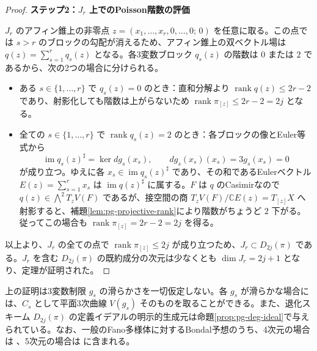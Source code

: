 \begin{proof}
\par\medskip\noindent\textbf{ステップ2：$J_r$ 上でのPoisson階数の評価}\par\nobreak\smallskip
$J_r$ のアフィン錐上の非零点 $z=(x_1,\ldots,x_r,0,\ldots,0;\,0)$ を任意に取る。この点では $s>r$ のブロックの勾配が消えるため、アフィン錐上の双ベクトル場は $q(z)=\sum_{s=1}^r q_s(z)$ となる。各3変数ブロック $q_s(z)$ の階数は $0$ または $2$ であるから、次の2つの場合に分けられる。
\begin{itemize}
  \item ある $s\in\{1,\ldots,r\}$ で $q_s(z)=0$ のとき：直和分解より $\operatorname{rank} q(z)\le 2r-2$ であり、射影化しても階数は上がらないため $\operatorname{rank}\pi_{[z]}\le 2r-2=2j$ となる。
  \item 全ての $s\in\{1,\ldots,r\}$ で $\operatorname{rank} q_s(z)=2$ のとき：各ブロックの像とEuler等式から
  \begin{equation}
    \operatorname{im}q_s(z)^\sharp=\ker dg_s(x_s),
    \qquad dg_s(x_s)(x_s)=3g_s(x_s)=0
  \end{equation}
  が成り立つ。ゆえに各 $x_s\in\operatorname{im}q_s(z)^\sharp$ であり、その和であるEulerベクトル $E(z)=\sum_{s=1}^r x_s$ は $\operatorname{im}q(z)^\sharp$ に属する。$F$ は $q$ のCasimirなので $q(z)\in\bigwedge^2 T_z V(F)$ であるが、接空間の商 $T_z V(F)/\mathbb C E(z)=T_{[z]}X$ へ射影すると、補題\ref{lem:pg-projective-rank}により階数がちょうど $2$ 下がる。従ってこの場合も $\operatorname{rank}\pi_{[z]}=2r-2=2j$ を得る。
\end{itemize}
以上より、$J_r$ の全ての点で $\operatorname{rank}\pi_{[z]}\le 2j$ が成り立つため、$J_r\subset D_{2j}(\pi)$ である。$J_r$ を含む $D_{2j}(\pi)$ の既約成分の次元は少なくとも $\dim J_r=2j+1$ となり、定理が証明された。
\end{proof}

\begin{remark}\label{rem:pg-bondal-scope}
上の証明は3変数制限 $g_s$ の滑らかさを一切仮定しない。各 $g_s$ が滑らかな場合には、$C_s$ として平面3次曲線 $V(g_s)$ そのものを取ることができる。また、退化スキーム $D_{2j}(\pi)$ の定義イデアルの明示的生成元は命題\ref{prop:pg-deg-ideal}で与えられている。なお、一般のFano多様体に対するBondal予想のうち、4次元の場合は \cite[Theorem~7.13]{BondalGualtieriPym}、5次元の場合は \cite[Corollary~1.3]{BondalDruelPereiraPymTouzet} に含まれる。
\end{remark}
